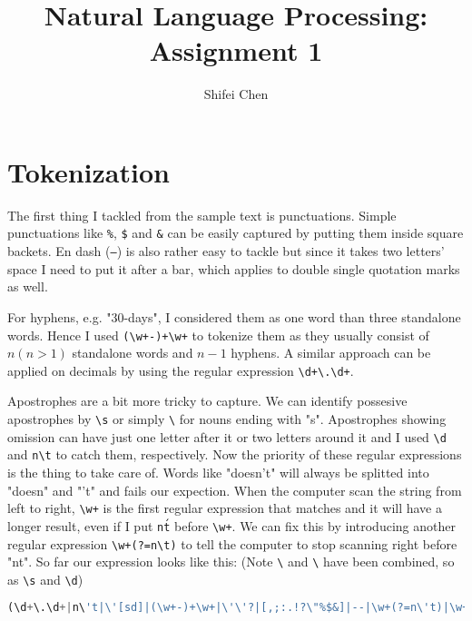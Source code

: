 \documentclass[11pt]{article} %
\title{{\LARGE Natural Language Processing: Assignment 1}\\[1.5mm]} %
\author{Shifei Chen} %
\begin{document}
\maketitle

\section{Tokenization}

The first thing I tackled from the sample text is punctuations. Simple punctuations like \verb|%|, \verb|$| and \verb|&| can be easily captured by putting them inside square backets. En dash (\texttt{--}) is also rather easy to tackle but since it takes two letters' space I need to put it after a bar, which applies to double single quotation marks as well.

For hyphens, e.g. "30-days", I considered them as one word than three standalone words. Hence I used \texttt{(\textbackslash w+-)+\textbackslash w+} to tokenize them as they usually consist of $n(n>1)$ standalone words and $n-1$ hyphens. A similar approach can be applied on decimals by using the regular expression \texttt{\textbackslash d+\textbackslash.\textbackslash d+}.

Apostrophes are a bit more tricky to capture. We can identify possesive apostrophes by \texttt{\textbackslash\textquotesingle s} or simply \texttt{\textbackslash\textquotesingle} for nouns ending with "s". Apostrophes showing omission can have just one letter after it or two letters around it and I used \texttt{\textbackslash\textquotesingle d} and \texttt{n\textbackslash\textquotesingle t} to catch them, respectively. Now the priority of these regular expressions is the thing to take care of. Words like "doesn't" will always be splitted into "doesn" and "'t" and fails our expection. When the computer scan the string from left to right, \verb|\w+| is the first regular expression that matches and it will have a longer result, even if I put \texttt{n\'t} before \texttt{\textbackslash w+}. We can fix this by introducing another regular expression \texttt{\textbackslash w+(?=n\textbackslash\textquotesingle t)} to tell the computer to stop scanning right before "n\textquotesingle t". So far our expression looks like this: 
(Note \texttt{\textbackslash\textquotesingle} and \texttt{\textbackslash\textquotesingle} have been combined, so as \texttt{\textbackslash\textquotesingle s} and \texttt{\textbackslash\textquotesingle d})

\begin{lstlisting}[language=Python, frame=single]
(\d+\.\d+|n\'t|\'[sd]|(\w+-)+\w+|\'\'?|[,;:.!?\"%$&]|--|\w+(?=n\'t)|\w+)
\end{lstlisting}
\end{document}
